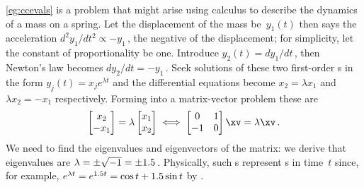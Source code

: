 \cref{eg:ccevals} is a problem that might arise using calculus to describe the dynamics of a mass on a spring.  
Let the displacement of the mass be~\(y_1(t)\) then  says the acceleration \(d^2y_1/dt^2\propto -y_1\)\,, the negative of the displacement; for simplicity, let the constant of proportionality be one.  
Introduce \(y_2(t)=dy_1/dt\)\,, then Newton's law becomes \(dy_2/dt=-y_1\)\,.  
Seek solutions of these two first-order s in the form \(y_j(t)=x_je^{\lambda t}\) and the differential equations become \(x_2=\lambda x_1\) and \(\lambda x_2=-x_1\) respectively.  
Forming into a matrix-vector problem these are
\begin{equation*}
\begin{bmatrix} x_2\\-x_1 \end{bmatrix}
=\lambda\begin{bmatrix} x_1\\x_2 \end{bmatrix}
\iff
\begin{bmatrix} 0&1\\-1&0 \end{bmatrix}\xv=\lambda\xv\,.
\end{equation*}
We need to find the eigenvalues and eigenvectors of the matrix: we derive that eigenvalues are \(\lambda=\pm \sqrt{-1}=\pm 1.5\)\,. 
Physically, such s represent s in time~\(t\) since, for example, \(e^{\lambda t}=e^{1.5 t}=\cos t+1.5\sin t\) by . 








\sectionExercises


